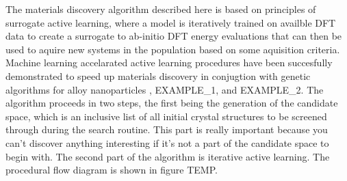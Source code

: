 

The materials discovery algorithm described here is based on principles of surrogate active learning,
where a model is iteratively trained on availble DFT data to create a surrogate to ab-initio DFT energy evaluations that can then be used to aquire new systems in the population based on some aquisition criteria.
%
Machine learning accelarated active learning procedures have been succesfully demonstrated to speed up materials discovery in conjugtion with genetic algorithms for alloy nanoparticles \cite{Jennings2019}, EXAMPLE_1, and EXAMPLE_2.
The algorithm proceeds in two steps, the first being the generation of the candidate space,
which is an inclusive list of all initial crystal structures to be screened through during the search routine.
%
This part is really important because you can't discover anything interesting if it's not a part of the candidate space to begin with.
The second part of the algorithm is iterative active learning.
The procedural flow diagram is shown in figure TEMP.



